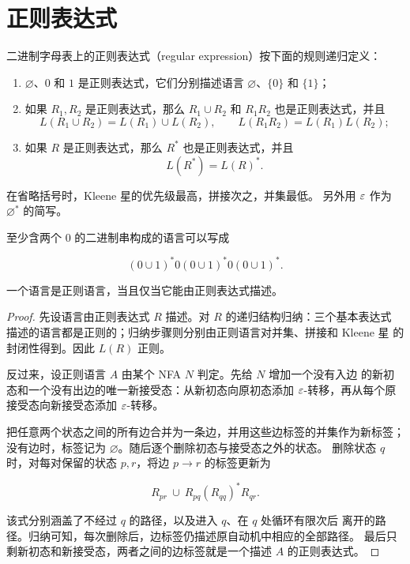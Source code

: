\section{正则表达式}

\begin{definition}[正则表达式]
  \label{def:regular-expression}
  二进制字母表上的正则表达式（regular expression）按下面的规则递归定义：

  \begin{enumerate}[label=\arabic*.]
    \item $\varnothing$、$0$ 和 $1$ 是正则表达式，它们分别描述语言
      $\varnothing$、$\{0\}$ 和 $\{1\}$；
    \item 如果 $R_1,R_2$ 是正则表达式，那么 $R_1\cup R_2$ 和 $R_1R_2$
      也是正则表达式，并且
      \[
        L(R_1\cup R_2)=L(R_1)\cup L(R_2),
        \qquad
        L(R_1R_2)=L(R_1)L(R_2);
      \]
    \item 如果 $R$ 是正则表达式，那么 $R^*$ 也是正则表达式，并且
      \[
        L(R^*)=L(R)^*.
      \]
  \end{enumerate}

  在省略括号时，Kleene 星的优先级最高，拼接次之，并集最低。
  另外用 $\varepsilon$ 作为 $\varnothing^*$ 的简写。
\end{definition}

\begin{example}
  \label{ex:regex-at-least-two-zeroes}
  至少含两个 $0$ 的二进制串构成的语言可以写成

  \[
    (0\cup1)^*0(0\cup1)^*0(0\cup1)^*.
  \]
\end{example}

\begin{theorem}[正则表达式刻画正则语言]
  \label{thm:regular-expression-characterization}
  一个语言是正则语言，当且仅当它能由正则表达式描述。
\end{theorem}

\begin{proof}
  先设语言由正则表达式 $R$ 描述。对 $R$ 的递归结构归纳：三个基本表达式
  描述的语言都是正则的；归纳步骤则分别由正则语言对并集、拼接和 Kleene 星
  的封闭性得到。因此 $L(R)$ 正则。

  反过来，设正则语言 $A$ 由某个 NFA $N$ 判定。先给 $N$ 增加一个没有入边
  的新初态和一个没有出边的唯一新接受态：从新初态向原初态添加
  $\varepsilon$-转移，再从每个原接受态向新接受态添加 $\varepsilon$-转移。

  把任意两个状态之间的所有边合并为一条边，并用这些边标签的并集作为新标签；
  没有边时，标签记为 $\varnothing$。随后逐个删除初态与接受态之外的状态。
  删除状态 $q$ 时，对每对保留的状态 $p,r$，将边 $p\to r$ 的标签更新为

  \[
    R_{pr}\ \cup\ R_{pq}(R_{qq})^*R_{qr}.
  \]

  该式分别涵盖了不经过 $q$ 的路径，以及进入 $q$、在 $q$ 处循环有限次后
  离开的路径。归纳可知，每次删除后，边标签仍描述原自动机中相应的全部路径。
  最后只剩新初态和新接受态，两者之间的边标签就是一个描述 $A$ 的正则表达式。
\end{proof}


